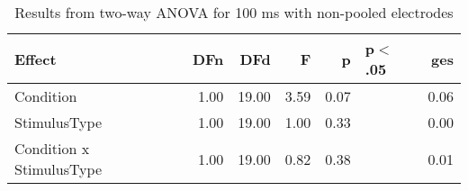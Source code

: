 \begin{table}[ht]
\centering
\begin{tabulary}{\textwidth}{lrrrrlr}
  \toprule
Effect & DFn & DFd & F & p & p$<$.05 & ges \\ 
  \midrule
Condition & 1.00 & 19.00 & 3.59 & 0.07 &  & 0.06 \\ 
  StimulusType & 1.00 & 19.00 & 1.00 & 0.33 &  & 0.00 \\ 
  Condition x StimulusType & 1.00 & 19.00 & 0.82 & 0.38 &  & 0.01 \\ 
   \bottomrule
\end{tabulary}
\caption{Results from two-way ANOVA for 100 ms with non-pooled electrodes} 
\end{table}
